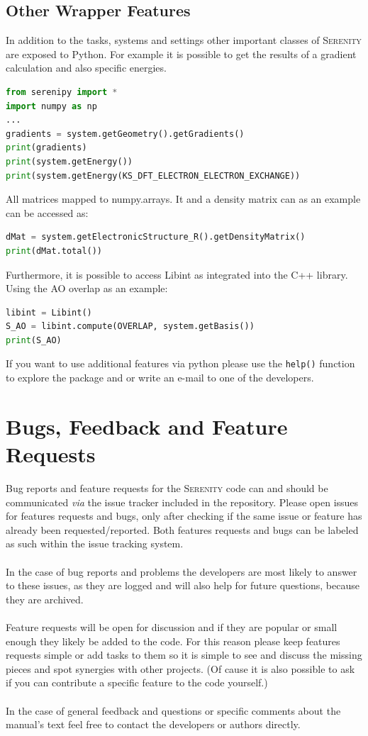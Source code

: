 \documentclass[bibliography=totocnumbered,a4paper,10pt]{scrartcl}
\newcommand{
\serenity}{\textsc{Serenity}\xspace}
\begin{document}
\subsection{Other Wrapper Features}
In addition to the tasks, systems and settings other important classes of \serenity are exposed to Python.
For example it is possible to get the results of a gradient calculation and also specific energies.
\begin{lstlisting}[language=Python]
from serenipy import *  
import numpy as np  
...
gradients = system.getGeometry().getGradients()
print(gradients)
print(system.getEnergy())
print(system.getEnergy(KS_DFT_ELECTRON_ELECTRON_EXCHANGE))
\end{lstlisting}
All matrices mapped to numpy.arrays.
It and a density matrix can as an example can be accessed as:
\begin{lstlisting}[language=Python]
dMat = system.getElectronicStructure_R().getDensityMatrix()
print(dMat.total())
\end{lstlisting}
Furthermore, it is possible to access Libint as integrated into the C++ library.
Using the AO overlap as an example:
\begin{lstlisting}[language=Python]
libint = Libint()
S_AO = libint.compute(OVERLAP, system.getBasis())
print(S_AO)
\end{lstlisting}
If you want to use additional features via python please use the \texttt{help()} function to explore the package
and or write an e-mail to one of the developers.

\newpage 
\section{Bugs, Feedback and Feature Requests}
Bug reports and feature requests for the \serenity code can and should be communicated \textit{via} the issue tracker included in the 
repository. Please open issues for features requests and bugs, only after checking if the same issue or feature has already been requested/reported.
Both features requests and bugs can be labeled as such within the issue tracking system.\\
\\
In the case of bug reports and problems the developers are most likely to answer to these issues, as they are logged and will also help for future questions, because they
are archived. \\
\\
Feature requests will be open for discussion and if they are popular or small enough they likely be added to the code.
For this reason please keep features requests simple or add tasks to them so it is simple to see and discuss the missing pieces and spot
synergies with other projects.
(Of cause it is also possible to ask if you can contribute a specific feature to the code yourself.)\\
\\
In the case of general feedback and questions or specific comments about the manual's text feel free to contact the developers or authors directly.
\end{document}
